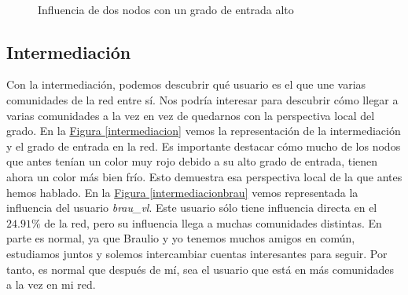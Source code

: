 \documentclass[10pt,a4paper,spanish]{article}
\numberwithin{equation}{section} %
\numberwithin{figure}{section} %
\numberwithin{table}{section} %
\begin{document}
\begin{figure}[!h]
    \centering
    \mbox{
    }
    \caption{Influencia de dos nodos con un grado de entrada alto}
    \label{infllocal}
\end{figure}

\subsection{Intermediación}
Con la intermediación, podemos descubrir qué usuario es el que une varias comunidades de la red entre sí. Nos podría interesar para descubrir cómo llegar a varias comunidades a la vez en vez de quedarnos con la perspectiva local del grado. En la \hyperref[intermediacion]{Figura \ref*{intermediacion}} vemos la representación de la intermediación y el grado de entrada en la red. Es importante destacar cómo mucho de los nodos que antes tenían un color muy rojo debido a su alto grado de entrada, tienen ahora un color más bien frío. Esto demuestra esa perspectiva local de la que antes hemos hablado. En la \hyperref[intermediacionbrau]{Figura \ref*{intermediacionbrau}} vemos representada la influencia del usuario \textit{brau\_vl}. Este usuario sólo tiene influencia directa en el $24.91\%$ de la red, pero su influencia llega a muchas comunidades distintas. En parte es normal, ya que Braulio y yo tenemos muchos amigos en común, estudiamos juntos y solemos intercambiar cuentas interesantes para seguir. Por tanto, es normal que después de mí, sea el usuario que está en más comunidades a la vez en mi red.
\end{document}
